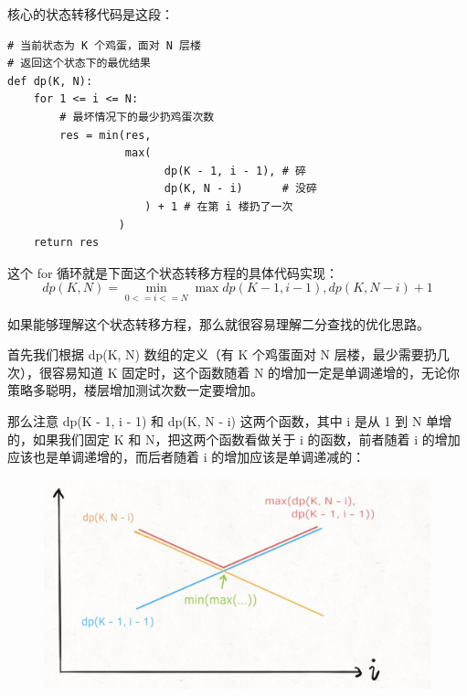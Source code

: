 \documentclass[12pt]{article}
\begin{document}
核心的状态转移代码是这段：
\begin{lstlisting}
# 当前状态为 K 个鸡蛋，面对 N 层楼
# 返回这个状态下的最优结果
def dp(K, N):
    for 1 <= i <= N:
        # 最坏情况下的最少扔鸡蛋次数
        res = min(res, 
                  max( 
                        dp(K - 1, i - 1), # 碎
                        dp(K, N - i)      # 没碎
                     ) + 1 # 在第 i 楼扔了一次
                 )
    return res
\end{lstlisting}

这个 for 循环就是下面这个状态转移方程的具体代码实现：
$$
dp(K, N) = \min_{0 <= i <= N}{\max{dp(K - 1, i - 1), dp(K, N - i)} + 1}
$$

如果能够理解这个状态转移方程，那么就很容易理解二分查找的优化思路。

首先我们根据 dp(K, N) 数组的定义（有 K 个鸡蛋面对 N 层楼，最少需要扔几次），很容易知道 K 固定时，这个函数随着 N 的增加一定是单调递增的，无论你策略多聪明，楼层增加测试次数一定要增加。

那么注意 dp(K - 1, i - 1) 和 dp(K, N - i) 这两个函数，其中 i 是从 1 到 N 单增的，如果我们固定 K 和 N，把这两个函数看做关于 i 的函数，前者随着 i 的增加应该也是单调递增的，而后者随着 i 的增加应该是单调递减的：
\begin{figure}[H]
    \centering
    \includegraphics[width=.5\textwidth]{fig/Dynamic_Programming_Egg_Throw_1.png}
\end{figure}
\end{document}
